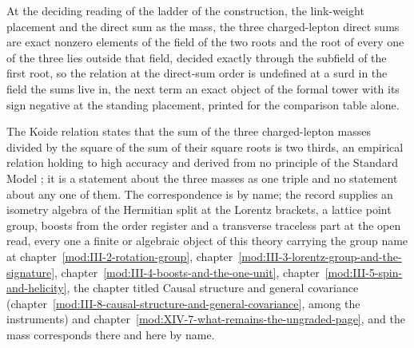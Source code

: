 At the deciding reading of the ladder of the construction, the link-weight placement and the direct sum as the mass, the three charged-lepton direct sums are exact nonzero elements of the field of the two roots and the root of every one of the three lies outside that field, decided exactly through the subfield of the first root, so the relation at the direct-sum order is undefined at a surd in the field the sums live in, the next term an exact object of the formal tower with its sign negative at the standing placement, printed for the comparison table alone.
\begin{chbridge}
The Koide relation states that the sum of the three charged-lepton masses divided by the square of the sum of their square roots is two thirds, an empirical relation holding to high accuracy and derived from no principle of the Standard Model \cite{Koide1983}; it is a statement about the three masses as one triple and no statement about any one of them. The correspondence is by name; the record supplies an isometry algebra of the Hermitian split at the Lorentz brackets, a lattice point group, boosts from the order register and a transverse traceless part at the open read, every one a finite or algebraic object of this theory carrying the group name at chapter~\ref{mod:III-2-rotation-group}, chapter~\ref{mod:III-3-lorentz-group-and-the-signature}, chapter~\ref{mod:III-4-boosts-and-the-one-unit}, chapter~\ref{mod:III-5-spin-and-helicity}, the chapter titled Causal structure and general covariance (chapter~\ref{mod:III-8-causal-structure-and-general-covariance}, among the instruments) and chapter~\ref{mod:XIV-7-what-remains-the-ungraded-page}, and the mass corresponds there and here by name.
\end{chbridge}
